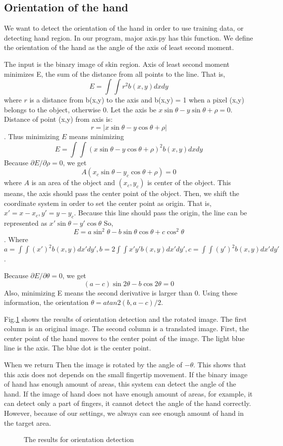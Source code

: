 \subsection{Orientation of the hand}
We want to detect the orientation of the hand in order to use training data, or detecting hand region.
In our program, major axis.py has this function.
We define the orientation of the hand as the angle of the axis of least second moment.\par
The input is the binary image of skin region.
Axis of least second moment minimizes E, the sum of the distance from all points to the line. That is,
$$E = \int \int r^2 b(x,y) dxdy$$
where $r$ is a distance from b(x,y) to the axis and b(x,y) = 1 when a pixel (x,y) belongs to the object, otherwise 0.
Let the axis be $x\sin{\theta} - y\sin{\theta} + \rho = 0$.
Distance of point (x,y) from axis is:
$$r = |x\sin{\theta}-y\cos{\theta}+\rho|$$.
Thus minimizing $E$ means minimizing
$$E = \int\int (x\sin{\theta}-y\cos{\theta}+\rho)^2 b(x,y)dxdy$$
Because $\partial E / \partial \rho = 0$, we get
$$A(x_c \sin{\theta} - y_c \cos{\theta} + \rho) = 0$$
where $A$ is an area of the object and $(x_c,y_c)$ is center of the object.
This means, the axis should pass the center point of the object.
Then, we shift the coordinate system in order to set the center point as origin.
That is, 
$x'= x - x_c, y' = y - y_c$.
Because this line should pass the origin, the line can be represented as
$x'\sin{\theta}-y'\cos{\theta}$
So, $$E = a \sin^2{\theta} - b\sin{\theta}\cos{\theta} + c\cos^2{\theta}$$.
Where $a = \int\int (x')^2 b(x,y) dx'dy', b = 2\int\int x'y' b(x,y) dx'dy', 
c = \int\int (y')^2 b(x,y)dx'dy'$.\par
Because $\partial E / \partial \theta = 0$, we get
$$(a-c)\sin{2\theta} - b\cos{2\theta} = 0$$
Also, minimizing E means the second derivative is larger than 0.
Using these information, the orientation $\theta = atan2(b,a-c)/2$.\par
Fig.\ref{fig:mom2} shows the results of orientation detection and the rotated image.
The first column is an original image.
The second column is a translated image. First, the center point of the hand moves to the center point of the image.
The light blue line is the axis. The blue dot is the center point.\par
When we return Then the image is rotated by the angle of $-\theta$.
This shows that this axis does not depends on the small fingertip movement.
If the binary image of hand has enough amount of areas, this system can detect the angle of the hand.
If the image of hand does not have enough amount of areas, for example, it can detect only a part of fingers,
it cannot detect the angle of the hand correctly.
However, because of our settings, we always can see enough amount of hand in the target area.
\begin{figure}
 
 \caption{The results for orientation detection}
 \label{fig:mom2}
\end{figure}
